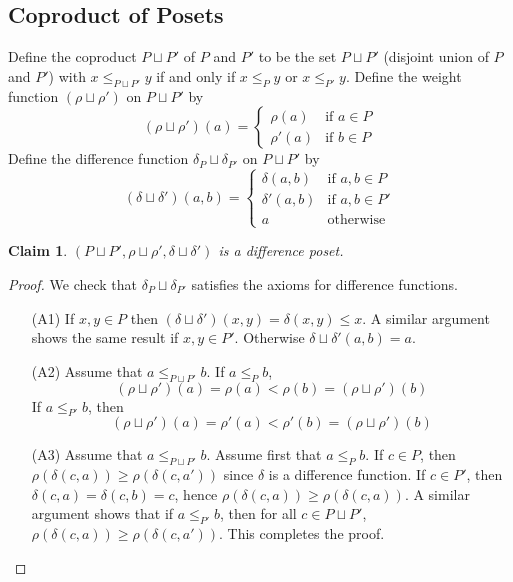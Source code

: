 \documentclass[acmsmall,review,anonymous]{acmart}\settopmatter{printfolios=true,printccs=false,printacmref=false}
\newtheorem{claim}{Claim}
\begin{document}
\subsection{Coproduct of Posets}
Define the coproduct $P \sqcup P'$ of $P$ and $P'$ to be the set $P \sqcup P'$
(disjoint union of $P$ and $P'$) with $x \leq_{P \sqcup P'} y$ if and only if
$x \leq_P y$ or $x \leq_{P'} y$. Define the weight function
$(\rho \sqcup \rho')$ on $P \sqcup P'$ by
$$(\rho \sqcup \rho')(a) =
\begin{cases}
\rho(a) &\text{if }a \in P\\
\rho'(a) &\text{if }b \in P
\end{cases}$$
Define the difference function $\delta_P \sqcup \delta_{P'}$ on $P \sqcup P'$ by
$$(\delta \sqcup \delta')(a, b) =
\begin{cases}
\delta(a, b) &\text{if }a, b \in P\\
\delta'(a, b) &\text{if }a, b \in P'\\
a & \text{otherwise}
\end{cases}$$
\begin{claim}\label{coproductdifference}
$(P \sqcup P', \rho \sqcup \rho', \delta \sqcup \delta')$ is a difference poset.
\end{claim}
\begin{proof}
We check that $\delta_P \sqcup \delta_{P'}$ satisfies the axioms for difference
functions.
\begin{enumerate}
  \item[(A1)]
  If $x, y \in P$ then $(\delta \sqcup \delta')(x, y) = \delta(x, y) \leq x$.
  A similar argument shows the same result if $x, y \in P'$. Otherwise $\delta
  \sqcup \delta'(a, b) = a$.
  \item[(A2)]
  Assume that $a \leq_{P \sqcup P'} b$. If $a \leq_P b$,
  $$(\rho \sqcup \rho')(a) = \rho(a) < \rho(b) = (\rho \sqcup \rho')(b)$$
  If $a \leq_{P'} b$, then
  $$(\rho \sqcup \rho')(a) = \rho'(a) < \rho'(b) = (\rho \sqcup \rho')(b)$$
  \item[(A3)]
  Assume that $a \leq_{P \sqcup P'} b$. Assume first that $a \leq_P b$. If $c
  \in P$, then $\rho(\delta(c, a)) \geq \rho(\delta(c, a'))$ since $\delta$ is a
  difference function. If $c \in P'$, then $\delta(c, a) = \delta(c, b) = c$,
  hence $\rho(\delta(c, a)) \geq \rho(\delta(c, a))$. A similar argument shows
  that if $a \leq_{P'} b$, then for all $c \in P \sqcup P'$, $\rho(\delta(c, a))
  \geq \rho(\delta(c, a'))$. This completes the proof.
\end{enumerate}
\end{proof}
\end{document}
